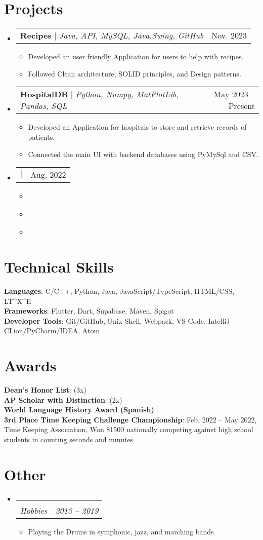 \documentclass[letterpaper,11pt]{article}
\makeatletter
\newcommand{\resumeItem}[1]{
  \item\small{
    {#1 \vspace{-2pt}}
  }
}
\newcommand{\resumeSubheading}[4]{
  \vspace{-2pt}\item
    \begin{tabular*}{0.97\textwidth}[t]{l@{\extracolsep{\fill}}r}
      \textbf{#1} & #2 \\
      \textit{\small#3} & \textit{\small #4} \\
    \end{tabular*}\vspace{-7pt}
}
\newcommand{\resumeProjectHeading}[2]{
    \item
    \begin{tabular*}{0.97\textwidth}{l@{\extracolsep{\fill}}r}
      \small#1 & #2 \\
    \end{tabular*}\vspace{-7pt}
}
\newcommand{\resumeSubHeadingListStart}{\begin{itemize}[leftmargin=0.15in, label={}]}
\newcommand{\resumeSubHeadingListEnd}{\end{itemize}}
\newcommand{\resumeItemListStart}{\begin{itemize}}
\newcommand{\resumeItemListEnd}{\end{itemize}\vspace{-5pt}}
\makeatother
\begin{document}
\section{Projects}
    \resumeSubHeadingListStart
      \resumeProjectHeading
          {\textbf{Recipes} $|$ \emph{Java, API, MySQL, Java.Swing, GitHub}}{Nov. 2023}
          \resumeItemListStart
            \resumeItem{Developed an user friendly Application for users to help with recipes.}
            \resumeItem{Followed Clean architecture, SOLID principles, and Design patterns.}
          \resumeItemListEnd
      \resumeProjectHeading
          {\textbf{HospitalDB} $|$ \emph{Python, Numpy, MatPlotLib, Pandas, SQL}}{May 2023 -- Present}
          \resumeItemListStart
            \resumeItem{Developed an Application for hospitals to store and retrieve records of patients.}
            \resumeItem{Connected the main UI with backend databases using PyMySql and CSV.}
          \resumeItemListEnd
      \resumeProjectHeading
          {\textbf{} $|$ \emph{}}{Aug. 2022}
          \resumeItemListStart
            \resumeItem{}
            \resumeItem{}
            \resumeItem{}
          \resumeItemListEnd
    \resumeSubHeadingListEnd

\section{Technical Skills}
 \begin{itemize}[leftmargin=0.15in, label={}]
    \small{\item{
     \textbf{Languages}{: C/C++, Python, Java, JavaScript/TypeScript, HTML/CSS, LT\textasciicircum X\textasciicircum E} \\
     \textbf{Frameworks}{: Flutter, Dart, Supabase, Maven, Spigot} \\
     \textbf{Developer Tools}{: Git/GitHub, Unix Shell, Webpack, VS Code, IntelliJ CLion/PyCharm/IDEA, Atom} \\
     }}
 \end{itemize}

\section{Awards}
 \begin{itemize}[leftmargin=0.15in, label={}]
    \small{\item{
     \textbf{Dean’s Honor List}{: (3x)} \\
     \textbf{AP Scholar with Distinction}{: (2x)} \\
     \textbf{World Language History Award (Spanish)}{ } \\
     \textbf{3rd Place Time Keeping Challenge Championship}{: Feb. 2022 -- May 2022, Time Keeping Association, Won \$1500 nationally competing against high school students in counting seconds and minutes}
    }}
 \end{itemize}

\section{Other}
\resumeSubHeadingListStart
    \resumeSubheading
      {}{ }
      {Hobbies}{2013 -- 2019}
      \resumeItemListStart
        \resumeItem{Playing the Drums in symphonic, jazz, and marching bands}
      \resumeItemListEnd
\resumeSubHeadingListEnd
\end{document}
